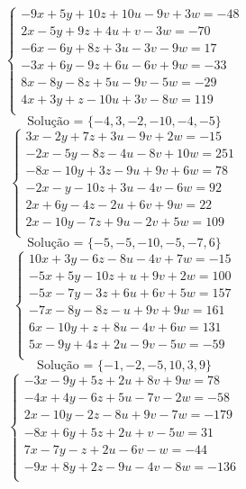 \documentclass[12pt,oneside,a4paper]{article}
\begin{document}
\vspace{\baselineskip}
\begin{equation*}
\begin{cases}
-9x+5y+10z+10u-9v+3w=-48 \\
2x-5y+9z+4u+v-3w=-70 \\
-6x-6y+8z+3u-3v-9w=17 \\
-3x+6y-9z+6u-6v+9w=-33 \\
8x-8y-8z+5u-9v-5w=-29 \\
4x+3y+z-10u+3v-8w=119 \\
\end{cases}
\end{equation*}
\begin{equation*}
\text{Solução = }\{-4,3,-2,-10,-4,-5\}
\end{equation*}
\vspace{\baselineskip}
\begin{equation*}
\begin{cases}
3x-2y+7z+3u-9v+2w=-15 \\
-2x-5y-8z-4u-8v+10w=251 \\
-8x-10y+3z-9u+9v+6w=78 \\
-2x-y-10z+3u-4v-6w=92 \\
2x+6y-4z-2u+6v+9w=22 \\
2x-10y-7z+9u-2v+5w=109 \\
\end{cases}
\end{equation*}
\begin{equation*}
\text{Solução = }\{-5,-5,-10,-5,-7,6\}
\end{equation*}
\vspace{\baselineskip}
\begin{equation*}
\begin{cases}
10x+3y-6z-8u-4v+7w=-15 \\
-5x+5y-10z+u+9v+2w=100 \\
-5x-7y-3z+6u+6v+5w=157 \\
-7x-8y-8z-u+9v+9w=161 \\
6x-10y+z+8u-4v+6w=131 \\
5x-9y+4z+2u-9v-5w=-59 \\
\end{cases}
\end{equation*}
\begin{equation*}
\text{Solução = }\{-1,-2,-5,10,3,9\}
\end{equation*}
\vspace{\baselineskip}
\begin{equation*}
\begin{cases}
-3x-9y+5z+2u+8v+9w=78 \\
-4x+4y-6z+5u-7v-2w=-58 \\
2x-10y-2z-8u+9v-7w=-179 \\
-8x+6y+5z+2u+v-5w=31 \\
7x-7y-z+2u-6v-w=-44 \\
-9x+8y+2z-9u-4v-8w=-136 \\
\end{cases}
\end{equation*}
\end{document}
